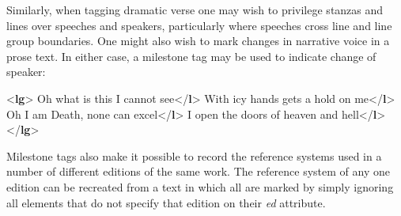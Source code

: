 Similarly, when tagging dramatic verse one may wish to privilege stanzas and lines over speeches and speakers, particularly where speeches cross line and line group boundaries. One might also wish to mark changes in narrative voice in a prose text. In either case, a milestone tag may be used to indicate change of speaker: \par\bgroup{}\exampleFont \begin{shaded}\noindent\mbox{}{<\textbf{lg}>}\mbox{}\newline 
{}\mbox{}\newline 
{}Oh what is this I cannot see{</\textbf{l}>}\mbox{}\newline 
{}With icy hands gets a hold on me{</\textbf{l}>}\mbox{}\newline 
{}\mbox{}\newline 
{}Oh I am Death, none can excel{</\textbf{l}>}\mbox{}\newline 
{}I open the doors of heaven and hell{</\textbf{l}>}\mbox{}\newline 
{</\textbf{lg}>}\end{shaded}\egroup\par \par
Milestone tags also make it possible to record the reference systems used in a number of different editions of the same work. The reference system of any one edition can be recreated from a text in which all are marked by simply ignoring all elements that do not specify that edition on their {\itshape ed} attribute.\par
